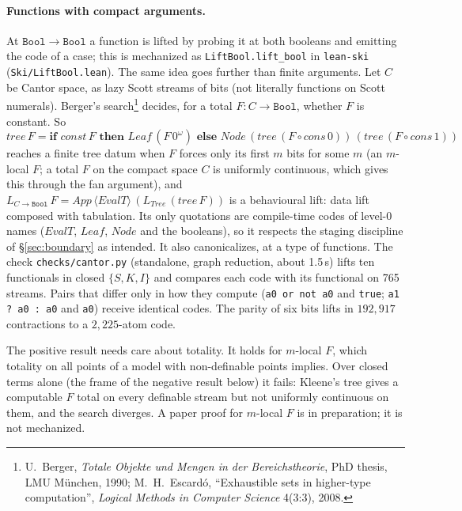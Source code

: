 \paragraph{Functions with compact arguments.}  At $\mathtt{Bool} \to
\mathtt{Bool}$ a function is lifted by probing it at both booleans and emitting
the code of a case; this is mechanized as \texttt{LiftBool.lift\_bool} in
\texttt{lean-ski} (\texttt{Ski/LiftBool.lean}).  The same idea goes further than
finite arguments.  Let $C$ be Cantor space, as lazy Scott streams of bits (not
literally functions on Scott numerals).
Berger's search\footnote{U.~Berger,
\emph{Totale Objekte und Mengen in der Bereichstheorie}, PhD thesis, LMU
M\"unchen, 1990; M.~H.~Escard\'o, ``Exhaustible sets in higher-type
computation'', \emph{Logical Methods in Computer Science} 4(3:3), 2008.}
decides, for a total $F : C \to \mathtt{Bool}$, whether $F$ is constant.  So
\[
\mathit{tree}\,F = \textbf{if } \mathit{const}\,F \textbf{ then }
\mathit{Leaf}\,(F\,0^\omega) \textbf{ else }
\mathit{Node}\,(\mathit{tree}\,(F \circ \mathit{cons}\,0))\,
(\mathit{tree}\,(F \circ \mathit{cons}\,1))
\]
reaches a finite tree datum when $F$ forces only its first $m$ bits for some
$m$ (an $m$-local $F$; a total $F$ on the compact space $C$ is uniformly
continuous, which gives this through the fan argument),
and $L_{C \to \mathtt{Bool}}\,F = \mathit{App}\,\langle \mathit{EvalT}\rangle\,
(L_{\mathit{Tree}}\,(\mathit{tree}\,F))$ is a behavioural lift: data lift
composed with tabulation.  Its only quotations are compile-time codes of
level-0 names ($\mathit{EvalT}$, $\mathit{Leaf}$, $\mathit{Node}$ and the
booleans), so it respects the staging discipline of \S\ref{sec:boundary} as
intended.  It also canonicalizes, at a type of
functions.  The check \texttt{checks/cantor.py} (standalone, graph
reduction, about 1.5\,s) lifts ten functionals in closed $\{S,K,I\}$ and
compares each code with its functional on 765 streams.  Pairs that differ
only in how they compute (\texttt{a0 or not a0} and \texttt{true};
\texttt{a1 ? a0 : a0} and \texttt{a0}) receive identical codes.  The parity
of six bits lifts in $192{,}917$ contractions to a $2{,}225$-atom code.

The positive result needs care about totality.  It holds for $m$-local $F$,
which totality on all points of a model with non-definable points implies.
Over closed terms alone (the frame of the negative result below) it fails:
Kleene's tree gives a computable $F$ total on every definable stream but not
uniformly continuous on them, and the search diverges.  A paper proof for
$m$-local $F$ is in preparation; it is not mechanized.

